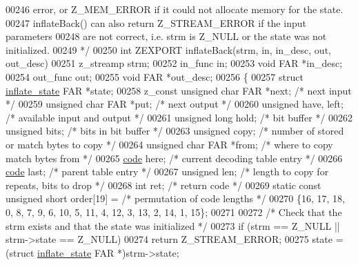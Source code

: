 \begin{DoxyCode}
00246 \textcolor{comment}{   error, or Z\_MEM\_ERROR if it could not allocate memory for the state.}
00247 \textcolor{comment}{   inflateBack() can also return Z\_STREAM\_ERROR if the input parameters}
00248 \textcolor{comment}{   are not correct, i.e. strm is Z\_NULL or the state was not initialized.}
00249 \textcolor{comment}{ */}
00250 \textcolor{keywordtype}{int} ZEXPORT inflateBack(strm, in, in\_desc, out, out\_desc)
00251 z\_streamp strm;
00252 in\_func in;
00253 \textcolor{keywordtype}{void} FAR *in\_desc;
00254 out\_func out;
00255 \textcolor{keywordtype}{void} FAR *out\_desc;
00256 \{
00257     \textcolor{keyword}{struct }\hyperlink{structinflate__state}{inflate\_state} FAR *state;
00258     z\_const \textcolor{keywordtype}{unsigned} \textcolor{keywordtype}{char} FAR *next;    \textcolor{comment}{/* next input */}
00259     \textcolor{keywordtype}{unsigned} \textcolor{keywordtype}{char} FAR *put;     \textcolor{comment}{/* next output */}
00260     \textcolor{keywordtype}{unsigned} have, left;        \textcolor{comment}{/* available input and output */}
00261     \textcolor{keywordtype}{unsigned} \textcolor{keywordtype}{long} hold;         \textcolor{comment}{/* bit buffer */}
00262     \textcolor{keywordtype}{unsigned} bits;              \textcolor{comment}{/* bits in bit buffer */}
00263     \textcolor{keywordtype}{unsigned} copy;              \textcolor{comment}{/* number of stored or match bytes to copy */}
00264     \textcolor{keywordtype}{unsigned} \textcolor{keywordtype}{char} FAR *from;    \textcolor{comment}{/* where to copy match bytes from */}
00265     \hyperlink{structcode}{code} here;                  \textcolor{comment}{/* current decoding table entry */}
00266     \hyperlink{structcode}{code} last;                  \textcolor{comment}{/* parent table entry */}
00267     \textcolor{keywordtype}{unsigned} len;               \textcolor{comment}{/* length to copy for repeats, bits to drop */}
00268     \textcolor{keywordtype}{int} ret;                    \textcolor{comment}{/* return code */}
00269     \textcolor{keyword}{static} \textcolor{keyword}{const} \textcolor{keywordtype}{unsigned} \textcolor{keywordtype}{short} order[19] = \textcolor{comment}{/* permutation of code lengths */}
00270         \{16, 17, 18, 0, 8, 7, 9, 6, 10, 5, 11, 4, 12, 3, 13, 2, 14, 1, 15\};
00271 
00272     \textcolor{comment}{/* Check that the strm exists and that the state was initialized */}
00273     \textcolor{keywordflow}{if} (strm == Z\_NULL || strm->state == Z\_NULL)
00274         \textcolor{keywordflow}{return} Z\_STREAM\_ERROR;
00275     state = (\textcolor{keyword}{struct }\hyperlink{structinflate__state}{inflate\_state} FAR *)strm->state;

\end{DoxyCode}
